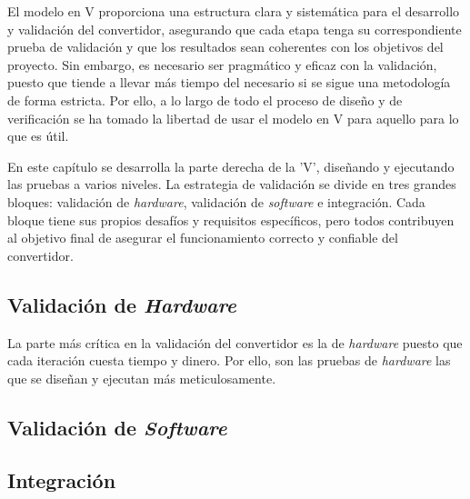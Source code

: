 El modelo en V proporciona una estructura clara y sistemática para el desarrollo y validación del convertidor, asegurando que cada etapa tenga su correspondiente prueba de validación y que los resultados sean coherentes con los objetivos del proyecto. Sin embargo, es necesario ser pragmático y eficaz con la validación, puesto que tiende a llevar más tiempo del necesario si se sigue una metodología de forma estricta. Por ello, a lo largo de todo el proceso de diseño y de verificación se ha tomado la libertad de usar el modelo en V para aquello para lo que es útil.

En este capítulo se desarrolla la parte derecha de la 'V', diseñando y ejecutando las pruebas a varios niveles. La estrategia de validación se divide en tres grandes bloques: validación de \textit{hardware}, validación de \textit{software} e integración. Cada bloque tiene sus propios desafíos y requisitos específicos, pero todos contribuyen al objetivo final de asegurar el funcionamiento correcto y confiable del convertidor.

\subsection{Validación de \textit{Hardware}}
La parte más crítica en la validación del convertidor es la de \textit{hardware} puesto que cada iteración cuesta tiempo y dinero. Por ello, son las pruebas de \textit{hardware} las que se diseñan y ejecutan más meticulosamente.

\subsection{Validación de \textit{Software}}

\subsection{Integración}
